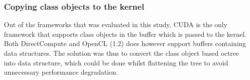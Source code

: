 \subsubsection{Copying class objects to the kernel}
Out of the frameworks that was evaluated in this study, CUDA is the only framework that supports class objects in the buffer which is passed to the kernel. Both DirectCompute and OpenCL (1.2) does however support buffers containing data structures. The solution was thus to convert the class object based octree into data structure, which could be done whilst flattening the tree to avoid unnecessary performance degradation. 
 